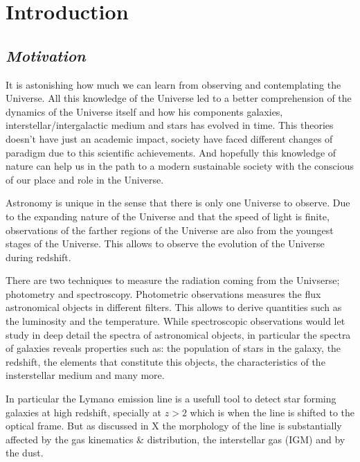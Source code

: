
\chapter{Introduction} %

\label{sec:intro} %


\section{\emph{Motivation}}

It is astonishing how much we can learn from observing and 
contemplating the Universe. All this knowledge of the Universe
led to a better comprehension of the dynamics of the Universe itself 
and how his components galaxies, interstellar/intergalactic
medium and stars has evolved in time. This theories doesn't have
just an academic impact, society have faced different changes of 
paradigm due to this scientific achievements. And hopefully this
knowledge of nature can help us in the path to a modern 
sustainable society with the conscious of our place and role 
in the Universe.  

Astronomy is unique in the sense that there is only one Universe 
to observe. Due to the expanding nature of the Universe and 
that the speed of light is finite, observations of the farther 
regions of the Universe are also from the youngest stages of the Universe.
This allows to observe the evolution of the Universe during redshift.

There are two techniques to measure the radiation coming from the 
Univserse; photometry and spectroscopy. Photometric observations measures 
the flux astronomical objects in different filters. This allows to derive quantities such as the luminosity and the temperature. While spectroscopic observations would let study in deep detail
the spectra of astronomical objects, in particular the spectra of 
galaxies reveals properties such as: the population of stars in the galaxy, the
redshift, the elements that constitute this objects, the characteristics 
of the insterstellar medium and many more.

In particular the Lyman$\alpha$ emission line is a usefull 
tool to detect star forming galaxies at high redshift, specially 
at $z>2$ which is when the line is shifted to the optical frame. But 
as discussed in X the morphology of the line is substantially affected
by the gas kinematics \& distribution, the interstellar gas (IGM)
 and by the dust. 

